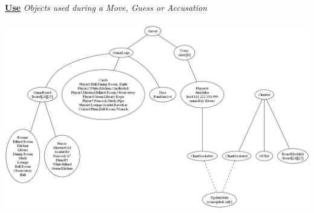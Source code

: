 \begin{flushleft}
	\newpage%
	{\Large \underline{\textbf{Use}}} %
	\textit{Objects used during a Move, Guess or Accusation} \\~\\%
	\includegraphics[width=7.5in,angle=90]{../DesignDocumentation/07_ObjectDiagrams/modelShortUse_REV02.jpg}%
\end{flushleft}